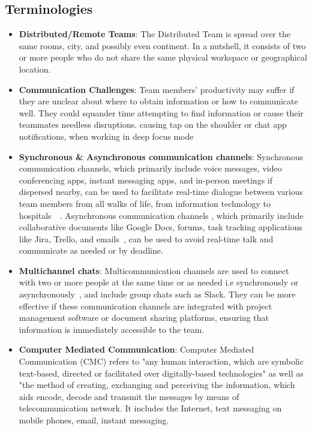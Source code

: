 \documentclass{llncs}
\begin{document}
\subsection{Terminologies}
 \begin{itemize}
    \item \textbf{Distributed/Remote Teams}: The Distributed Team is spread over the same rooms, city, and possibly even continent. In a nutshell, it consists of two or more people who do not share the same physical workspace or geographical location.~\cite{refbook1}\\
    \item \textbf{Communication Challenges}: Team members' productivity may suffer if they are unclear about where to obtain information or how to communicate well. They could squander time attempting to find information or cause their teammates needless disruptions. causing tap on the shoulder or chat app notifications, when working in deep focus mode ~\cite{refbook1}\\
    \item \textbf{Synchronous \& Asynchronous communication channels}: 
    Synchronous communication channels, which primarily include voice messages, video conferencing apps, instant messaging apps, and in-person meetings if dispersed nearby, can be used to facilitate real-time dialogue between various team members from all walks of life, from information technology to hospitals~\cite{refbook1}~\cite{refpaper1}.
    Asynchronous communication channels , which primarily include collaborative documents like Google Docs, forums, task tracking applications like Jira, Trello, and emails~\cite{refpaper2}, can be used to avoid real-time talk and communicate as needed or by deadline.~\cite{refbook1} \\
    \item \textbf{Multichannel chats}: Multicommunication channels are used to connect with two or more people at the same time or as needed i.e synchronously or asynchronously~\cite{refpaper3}, and include group chats such as Slack. They can be more effective if these communication channels are integrated with project management software or document sharing platforms, ensuring that information is immediately accessible to the team.~\cite{refpaper4}\\
    \item \textbf{Computer Mediated Communication}:  Computer Mediated Communication (CMC) refers to "any human interaction, which are symbolic text-based, directed or facilitated over digitally-based technologies" as well as "the method of creating, exchanging and perceiving the information, which aids encode, decode and transmit the messages by means of telecommunication network. It includes the Internet, text messaging on mobile phones, email, instant messaging.~\cite{refpaper5}
\end{itemize}
\end{document}
